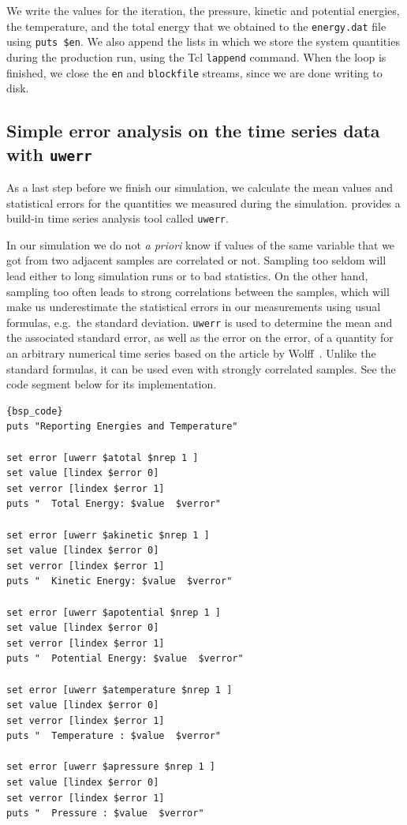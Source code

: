 \documentclass[
paper=a4,                       %
fontsize=11pt,                  %
twoside,                        %
footsepline,                    %
headsepline,                    %
headinclude=false,              %
footinclude=false,              %
pagesize,                       %
]{scrartcl}
\begin{document}
We write the values for the iteration, the pressure, kinetic and potential energies, the temperature, and the total energy that we obtained to the \texttt{energy.dat} file using \lstinline|puts $en|. We also append the lists in which we store the system quantities during the production run, using the Tcl \lstinline|lappend| command. When the loop is finished, we close the \verb"en" and \verb"blockfile" streams, since we are done writing to disk.

\subsection{Simple error analysis on the time series data with \texttt{uwerr}}

As a last step before we finish our simulation, we calculate the mean values and statistical errors for the quantities we measured during the simulation. \es{} provides a build-in time series analysis tool called \lstinline|uwerr|. 

In our simulation we do not \emph{a priori} know if values of the same variable that we got from two adjacent samples are correlated or not. Sampling too seldom will lead either to long simulation runs or to bad statistics. On the other hand, sampling too often leads to strong correlations between the samples, which will make us underestimate the statistical errors in our measurements using usual formulas, e.g.~the standard deviation. \lstinline|uwerr| is used to determine the mean and the associated standard error, as well as the error on the error, of a quantity for an arbitrary numerical time series based on the article by Wolff~\cite{wolff}. Unlike the standard formulas, it can be used even with strongly correlated samples. See the code segment below for its implementation.

{\small\vspace{0,2cm}
\begin{lstlisting}[firstnumber=auto]{bsp_code}
puts "Reporting Energies and Temperature"

set error [uwerr $atotal $nrep 1 ]
set value [lindex $error 0]
set verror [lindex $error 1]
puts "  Total Energy: $value  $verror"

set error [uwerr $akinetic $nrep 1 ]
set value [lindex $error 0]
set verror [lindex $error 1]
puts "  Kinetic Energy: $value  $verror"

set error [uwerr $apotential $nrep 1 ]
set value [lindex $error 0]
set verror [lindex $error 1]
puts "  Potential Energy: $value  $verror"

set error [uwerr $atemperature $nrep 1 ]
set value [lindex $error 0]
set verror [lindex $error 1]
puts "  Temperature : $value  $verror"

set error [uwerr $apressure $nrep 1 ]
set value [lindex $error 0]
set verror [lindex $error 1]
puts "  Pressure : $value  $verror"
\end{lstlisting}\vspace{0,2cm}
}
\end{document}

